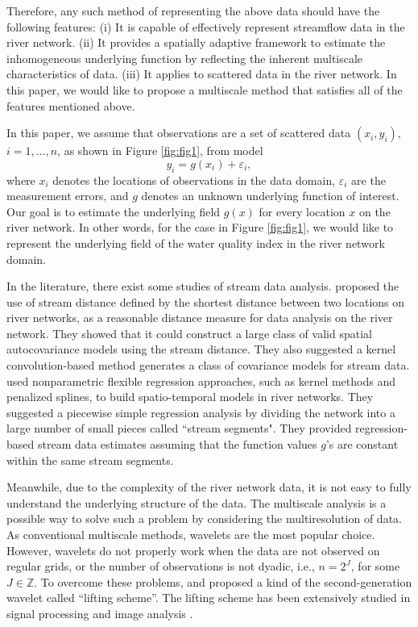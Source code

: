 \documentclass[11pt,titlepage]{article}
\begin{document}
Therefore, any such method of representing the above data should have the following features: (i) It is capable of effectively represent streamflow data in the river network. (ii) It provides a spatially adaptive framework to estimate the inhomogeneous underlying function by reflecting the inherent multiscale characteristics of data. (iii) It applies to scattered data in the river network. In this paper, we would like to propose a multiscale method that satisfies all of the features mentioned above. 

In this paper, we assume that observations are a set of scattered data $(x_i, y_i)$, $i=1,\ldots,n$, as shown in Figure \ref{fig:fig1}, from model 
\begin{equation}\label{eq:scattered}
y_i = g(x_i)+\varepsilon_i, 
\end{equation}
where $x_i$ denotes the locations of observations in the data domain, $\varepsilon_i$ are the measurement errors, and $g$  denotes an unknown underlying function of interest. Our goal is to estimate the underlying field $g(x)$ for every location $x$ on the river network. In other words, for the case in Figure \ref{fig:fig1}, we would like to represent the underlying field of the water quality index in the river network domain. 

In the literature, there exist some studies of stream data analysis. \cite{VerHoef(2006)} proposed the use of stream distance  defined by the shortest distance between two locations on river networks, as a reasonable distance measure for data analysis on the river network. They showed that it could construct a large class of valid spatial autocovariance models using the stream distance. They also suggested a kernel convolution-based method generates a class of covariance models for stream data. \cite{ODonnell2014} used nonparametric flexible regression approaches, such as kernel methods and penalized splines, to build spatio-temporal models in river networks. They suggested a piecewise simple regression analysis by dividing the network into a large number of small pieces called ``stream segments".  They provided regression-based stream data estimates  assuming that the function values $g$'s are constant within the same stream segments.

Meanwhile, due to the complexity of the river network data, it is not easy to fully understand the underlying structure of the  data. The multiscale analysis is a possible way to solve such a problem by considering the multiresolution of data. As conventional multiscale methods, wavelets are the most popular choice. However, wavelets do not properly work when the data are not observed on regular grids, or the number of observations is not dyadic, i.e., $n=2^{J}$, for some $J\in \mathbb{Z}$. To overcome these problems, \citet{Sweldens1996} and \citet{Sweldens1998} proposed a kind of the second-generation wavelet called ``lifting scheme''. The lifting scheme has been extensively studied in signal processing and image analysis \citep{Jansen2005}. 
\end{document}
